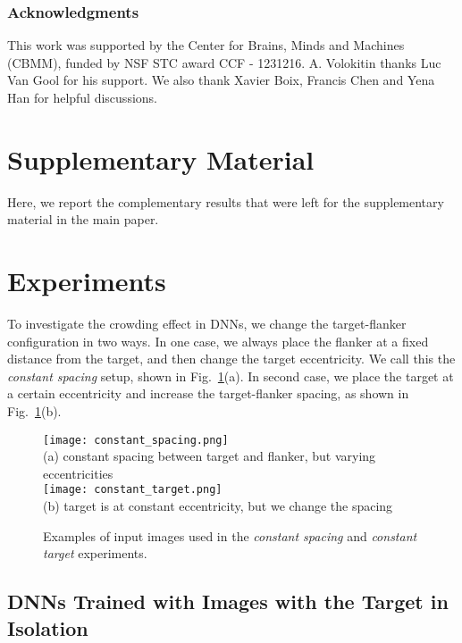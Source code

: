 \documentclass{article}
\begin{document}
\subsubsection*{Acknowledgments}
This work was supported by the Center for Brains, Minds
and Machines (CBMM), funded by NSF STC award CCF
- 1231216. A. Volokitin thanks Luc Van Gool for his support. We also thank Xavier Boix, Francis Chen and Yena Han for helpful discussions.

{\small{

}
}

\newpage
\normalsize
\appendix\section*{\huge{Supplementary Material}}

Here, we report the complementary results that were left for the supplementary material in the main paper.

\section{Experiments}
To investigate the crowding effect in DNNs, we change the target-flanker configuration in two ways.  In one case, we always place the flanker at a fixed distance from the target, and then change the target eccentricity.  We call this the \emph{constant spacing} setup, shown in Fig.~\ref{figapp:image-examples}(a).  In second case, we place the target at a certain eccentricity and increase the target-flanker spacing, as shown in Fig.~\ref{figapp:image-examples}(b). 

\begin{figure}[h!]
\centering
\texttt{[image: constant\_spacing.png]}\\
(a) constant spacing between target and flanker, but varying eccentricities\\
\texttt{[image: constant\_target.png]}\\
(b) target is at constant eccentricity, but we change the spacing
\caption{Examples of input images used in the \emph{constant spacing} and \emph{constant target} experiments.}
\label{figapp:image-examples}
\end{figure}\subsection{DNNs Trained with Images with the Target in Isolation}
\end{document}
